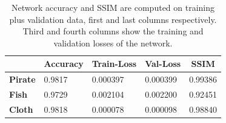 \begin{table}[h]
\begin{tabular}{|l|l|l|l|l|}
\hline
\textbf{}            & \textbf{Accuracy} & \textbf{Train-Loss} & \textbf{Val-Loss} & \multicolumn{1}{c|}{\textbf{SSIM}} \\ \hline
\textbf{Pirate} & 0.9817            & 0.000397            & 0.000399                 & 0.99386                      \\ \hline
\textbf{Fish}        & 0.9729            & 0.002104            & 0.002200                      &  0.92451                   \\ \hline
\textbf{Cloth}       & 0.9818            & 0.000078            & 0.000098                 & 0.98840                      \\ \hline
\end{tabular}
\caption{Network accuracy and SSIM are computed on training plus validation data, first and last columns respectively. Third and fourth columns show the training and validation losses of the network.} 
\label{Table: NN_Accuracy}
\end{table}
